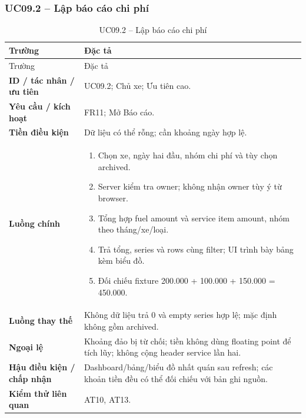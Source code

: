 \subsubsection{UC09.2 -- Lập báo cáo chi phí}\label{uc:UC09.2}
\begin{smalltable}\begin{longtable}{L{3.2cm}L{11.8cm}}
\caption{UC09.2 -- Lập báo cáo chi phí}\label{tab:UC09.2}\\
\toprule Trường & Đặc tả\\\midrule\endfirsthead
\toprule Trường & Đặc tả\\\midrule\endhead
\textbf{ID / tác nhân / ưu tiên} & UC09.2; Chủ xe; Ưu tiên cao.\\
\textbf{Yêu cầu / kích hoạt} & FR11; Mở Báo cáo.\\
\textbf{Tiền điều kiện} & Dữ liệu có thể rỗng; cần khoảng ngày hợp lệ.\\
\textbf{Luồng chính} & \begin{enumerate}[leftmargin=*,nosep]
\item Chọn xe, ngày hai đầu, nhóm chi phí và tùy chọn archived.
\item Server kiểm tra owner; không nhận owner tùy ý từ browser.
\item Tổng hợp fuel amount và service item amount, nhóm theo tháng/xe/loại.
\item Trả tổng, series và rows cùng filter; UI trình bày bảng kèm biểu đồ.
\item Đối chiếu fixture 200.000 + 100.000 + 150.000 = 450.000.
\end{enumerate}\\
\textbf{Luồng thay thế} & Không dữ liệu trả 0 và empty series hợp lệ; mặc định không gồm archived.\\
\textbf{Ngoại lệ} & Khoảng đảo bị từ chối; tiền không dùng floating point để tích lũy; không cộng header service lần hai.\\
\textbf{Hậu điều kiện / chấp nhận} & Dashboard/bảng/biểu đồ nhất quán sau refresh; các khoản tiền đều có thể đối chiếu với bản ghi nguồn.\\
\textbf{Kiểm thử liên quan} & AT10, AT13.\\
\bottomrule\end{longtable}\end{smalltable}
